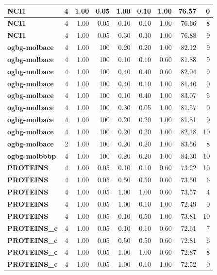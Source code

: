 \begin{longtable}{|l||r|r|r|r|r|r||r|r|}
		\textbf{NCI1} & 4 & 1.00 & 0.05 & 1.00 & 0.10 & 1.00 & 76.57 & 0 \\ \hline
		\textbf{NCI1} & 4 & 1.00 & 0.05 & 0.10 & 0.10 & 1.00 & 76.66 & 8 \\ \hline
		\textbf{NCI1} & 4 & 1.00 & 0.05 & 0.30 & 0.30 & 1.00 & 76.88 & 9 \\ \hline
		\textbf{ogbg-molbace} & 4 & 1.00 & 100 & 0.20 & 0.20 & 1.00 & 82.12 & 9 \\ \hline
		\textbf{ogbg-molbace} & 4 & 1.00 & 100 & 0.10 & 0.10 & 0.60 & 81.88 & 9 \\ \hline
		\textbf{ogbg-molbace} & 4 & 1.00 & 100 & 0.40 & 0.40 & 0.60 & 82.04 & 9 \\ \hline
		\textbf{ogbg-molbace} & 4 & 1.00 & 100 & 0.40 & 0.10 & 1.00 & 81.46 & 0 \\ \hline
		\textbf{ogbg-molbace} & 4 & 1.00 & 100 & 0.10 & 0.40 & 1.00 & 83.07 & 5 \\ \hline
		\textbf{ogbg-molbace} & 4 & 1.00 & 100 & 0.30 & 0.05 & 1.00 & 81.57 & 0 \\ \hline
		\textbf{ogbg-molbace} & 4 & 1.00 & 100 & 0.20 & 0.20 & 1.00 & 81.81 & 0 \\ \hline
		\textbf{ogbg-molbace} & 4 & 1.00 & 100 & 0.20 & 0.20 & 1.00 & 82.18 & 10 \\ \hline
		\textbf{ogbg-molbace} & 2 & 1.00 & 100 & 0.20 & 0.20 & 1.00 & 83.56 & 8 \\ \hline
		\textbf{ogbg-molbbbp} & 4 & 1.00 & 100 & 0.20 & 0.20 & 1.00 & 84.30 & 10 \\ \hline
		\textbf{PROTEINS} & 4 & 1.00 & 0.05 & 0.10 & 0.10 & 0.60 & 73.22 & 10 \\ \hline
		\textbf{PROTEINS} & 4 & 1.00 & 0.05 & 0.50 & 0.50 & 0.60 & 73.50 & 6 \\ \hline
		\textbf{PROTEINS} & 4 & 1.00 & 0.05 & 1.00 & 1.00 & 0.60 & 73.57 & 4 \\ \hline
		\textbf{PROTEINS} & 4 & 1.00 & 0.05 & 1.00 & 0.10 & 1.00 & 72.49 & 0 \\ \hline
		\textbf{PROTEINS} & 4 & 1.00 & 0.05 & 0.10 & 0.50 & 1.00 & 73.81 & 10 \\ \hline
		\textbf{PROTEINS\_c} & 4 & 1.00 & 0.05 & 0.10 & 0.10 & 0.60 & 72.61 & 7 \\ \hline
		\textbf{PROTEINS\_c} & 4 & 1.00 & 0.05 & 0.50 & 0.50 & 0.60 & 72.81 & 6 \\ \hline
		\textbf{PROTEINS\_c} & 4 & 1.00 & 0.05 & 1.00 & 1.00 & 0.60 & 72.87 & 8 \\ \hline
		\textbf{PROTEINS\_c} & 4 & 1.00 & 0.05 & 1.00 & 0.10 & 1.00 & 72.52 & 0 \\ \hline

\end{longtable}
